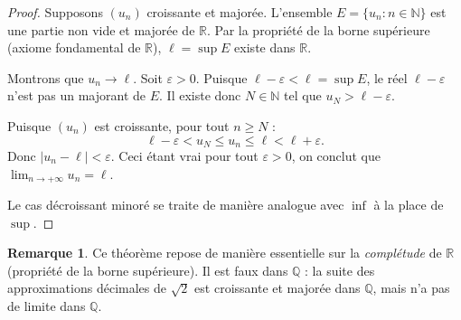\documentclass[12pt,a4paper,openany]{book}
\theoremstyle{definition}
\newtheorem{remarque}{Remarque}[chapter]
\newcommand{\N}{\mathbb{N}}
\newcommand{\Q}{\mathbb{Q}}
\newcommand{\R}{\mathbb{R}}
\newcommand{\eps}{\varepsilon}
\newcommand{\abs}[1]{\left\lvert #1 \right\rvert}
\begin{document}
\begin{proof}
  Supposons $(u_n)$ croissante et majorée. L'ensemble $E = \{u_n : n \in \N\}$ est une
  partie non vide et majorée de $\R$. Par la propriété de la borne supérieure (axiome
  fondamental de $\R$), $\ell = \sup E$ existe dans $\R$.

  Montrons que $u_n \to \ell$. Soit $\eps > 0$. Puisque $\ell - \eps < \ell = \sup E$,
  le réel $\ell - \eps$ n'est pas un majorant de $E$. Il existe donc $N \in \N$ tel que
  $u_N > \ell - \eps$.

  Puisque $(u_n)$ est croissante, pour tout $n \geq N$ :
  \[
    \ell - \eps < u_N \leq u_n \leq \ell < \ell + \eps.
  \]
  Donc $\abs{u_n - \ell} < \eps$. Ceci étant vrai pour tout $\eps > 0$, on conclut que
  $\lim_{n \to +\infty} u_n = \ell$.

  Le cas décroissant minoré se traite de manière analogue avec $\inf$ à la place de $\sup$.
\end{proof}

\begin{remarque}
  Ce théorème repose de manière essentielle sur la \emph{complétude} de $\R$ (propriété de
  la borne supérieure). Il est faux dans $\Q$ : la suite des approximations décimales de
  $\sqrt{2}$ est croissante et majorée dans $\Q$, mais n'a pas de limite dans $\Q$.
\end{remarque}

\begin{center}
\end{center}
\end{document}
